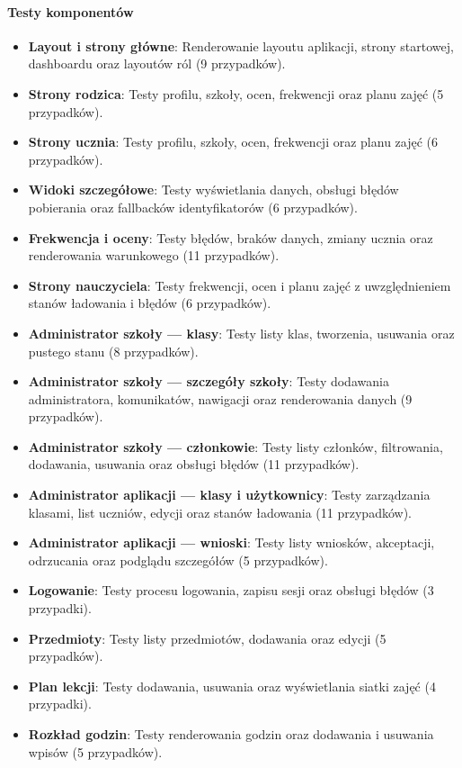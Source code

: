 \documentclass[12pt,a4paper]{article}
\begin{document}
\paragraph{Testy komponentów}
\begin{itemize}
    \item \textbf{Layout i strony główne}: Renderowanie layoutu aplikacji, strony startowej, dashboardu oraz layoutów ról (9 przypadków).
    \item \textbf{Strony rodzica}: Testy profilu, szkoły, ocen, frekwencji oraz planu zajęć (5 przypadków).
    \item \textbf{Strony ucznia}: Testy profilu, szkoły, ocen, frekwencji oraz planu zajęć (6 przypadków).
    \item \textbf{Widoki szczegółowe}: Testy wyświetlania danych, obsługi błędów pobierania oraz fallbacków identyfikatorów (6 przypadków).
    \item \textbf{Frekwencja i oceny}: Testy błędów, braków danych, zmiany ucznia oraz renderowania warunkowego (11 przypadków).
    \item \textbf{Strony nauczyciela}: Testy frekwencji, ocen i planu zajęć z uwzględnieniem stanów ładowania i błędów (6 przypadków).
    \item \textbf{Administrator szkoły — klasy}: Testy listy klas, tworzenia, usuwania oraz pustego stanu (8 przypadków).
    \item \textbf{Administrator szkoły — szczegóły szkoły}: Testy dodawania administratora, komunikatów, nawigacji oraz renderowania danych (9 przypadków).
    \item \textbf{Administrator szkoły — członkowie}: Testy listy członków, filtrowania, dodawania, usuwania oraz obsługi błędów (11 przypadków).
    \item \textbf{Administrator aplikacji — klasy i użytkownicy}: Testy zarządzania klasami, list uczniów, edycji oraz stanów ładowania (11 przypadków).
    \item \textbf{Administrator aplikacji — wnioski}: Testy listy wniosków, akceptacji, odrzucania oraz podglądu szczegółów (5 przypadków).
    \item \textbf{Logowanie}: Testy procesu logowania, zapisu sesji oraz obsługi błędów (3 przypadki).
    \item \textbf{Przedmioty}: Testy listy przedmiotów, dodawania oraz edycji (5 przypadków).
    \item \textbf{Plan lekcji}: Testy dodawania, usuwania oraz wyświetlania siatki zajęć (4 przypadki).
    \item \textbf{Rozkład godzin}: Testy renderowania godzin oraz dodawania i usuwania wpisów (5 przypadków).
\end{itemize}
\end{document}
